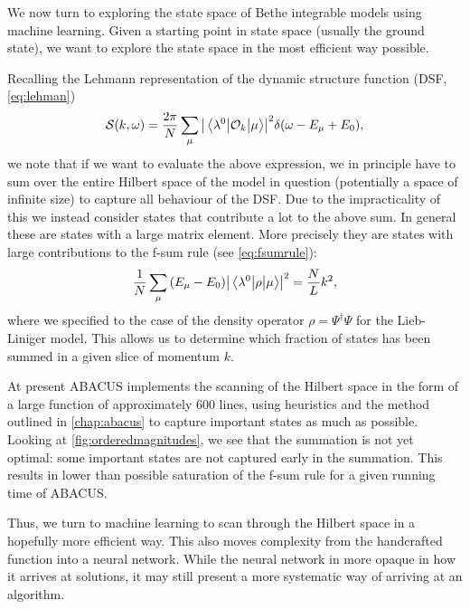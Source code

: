 \documentclass[11pt, a4paper]{report} %
\begin{document}
We now turn to exploring the state space of Bethe integrable models using machine learning.
Given a starting point in state space (usually the ground state), we want to explore the state space in the most efficient way possible.

Recalling the Lehmann representation of the dynamic structure function (DSF, \cref{eq:lehman})
\begin{equation}
  \mathcal{S}(k,\omega) = \frac{2\pi}{N}\sum_{\mu}\abs{\mel{\lambda^0}{\mathcal{O}_k}{\mu}}^2 \delta\qty(\omega-E_{\mu}+E_0), 
\end{equation}
we note that if we want to evaluate the above expression, we in principle have to sum over the entire Hilbert space of the model in question (potentially a space of  infinite size) to capture all behaviour of the DSF.\@
Due to the impracticality of this we instead consider states that contribute a lot to the above sum.
In general these are states with a large matrix element.
More precisely they are states with large contributions to the f-sum rule (see \cref{eq:fsumrule}):
\begin{align}
  \frac{1}{N}\sum_{\mu}\qty(E_{\mu}-E_0)\abs{\mel{\lambda^0}{\rho}{\mu}}^2  = \frac{N}{L} k^2,
\end{align}
where we specified to the case of the density operator \(\rho = \Psi^{\dag}\Psi\) for the Lieb-Liniger model.
This allows us to determine which fraction of states has been summed in a given slice of momentum \(k\).

At present ABACUS implements the scanning of the Hilbert space in the form of a large function of approximately 600 lines, using heuristics and the method outlined in \cref{chap:abacus} to capture important states as much as possible.
Looking at \cref{fig:orderedmagnitudes}, we see that the summation is not yet optimal: some important states are not captured early in the summation.
This results in lower than possible saturation of the f-sum rule for a given running time of ABACUS.\@

Thus, we turn to machine learning to scan through the Hilbert space in a hopefully more efficient way.
This also moves complexity from the handcrafted function into a neural network.
While the neural network in more opaque in how it arrives at solutions, it may still present a more systematic way of arriving at an algorithm.
\end{document}
